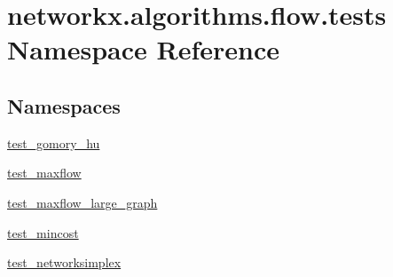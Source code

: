 \hypertarget{namespacenetworkx_1_1algorithms_1_1flow_1_1tests}{}\section{networkx.\+algorithms.\+flow.\+tests Namespace Reference}
\label{namespacenetworkx_1_1algorithms_1_1flow_1_1tests}
\subsection*{Namespaces}
\begin{DoxyCompactItemize}
\item 
 \hyperlink{namespacenetworkx_1_1algorithms_1_1flow_1_1tests_1_1test__gomory__hu}{test\+\_\+gomory\+\_\+hu}
\item 
 \hyperlink{namespacenetworkx_1_1algorithms_1_1flow_1_1tests_1_1test__maxflow}{test\+\_\+maxflow}
\item 
 \hyperlink{namespacenetworkx_1_1algorithms_1_1flow_1_1tests_1_1test__maxflow__large__graph}{test\+\_\+maxflow\+\_\+large\+\_\+graph}
\item 
 \hyperlink{namespacenetworkx_1_1algorithms_1_1flow_1_1tests_1_1test__mincost}{test\+\_\+mincost}
\item 
 \hyperlink{namespacenetworkx_1_1algorithms_1_1flow_1_1tests_1_1test__networksimplex}{test\+\_\+networksimplex}
\end{DoxyCompactItemize}
